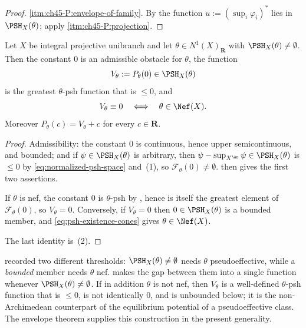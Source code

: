 \begin{proof}
\cref{itm:ch45-P:envelope-of-family}.  By  the
function $u:=(\sup_i\varphi_i)^*$ lies in $\PSH_X(\theta)$; apply
\cref{itm:ch45-P:projection}.
\end{proof}

\begin{corollary}
\label{cor:ch45-extremal}
Let $X$ be integral projective unibranch and let
$\theta\in N^1(X)_{\mathbf R}$ with $\PSH_X(\theta)\ne\emptyset$.  Then
the constant $0$ is an admissible obstacle for $\theta$, the function
\[
 V_\theta:=P_\theta(0)\in\PSH_X(\theta)
\]
is the greatest $\theta$-psh function that is $\le0$, and
\[
 V_\theta\equiv0
 \quad\Longleftrightarrow\quad
 \theta\in\Nef(X).
\]
Moreover $P_\theta(c)=V_\theta+c$ for every $c\in\mathbf R$.
\end{corollary}

\begin{proof}
Admissibility: the constant $0$ is continuous, hence upper semicontinuous,
and bounded; and if $\psi\in\PSH_X(\theta)$ is arbitrary, then
$\psi-\sup_{X^{\An}}\psi\in\PSH_X(\theta)$ is $\le0$ by
\eqref{eq:normalized-psh-space} and
\,(1), so $\mathcal F_\theta(0)\ne\emptyset$.
 then gives the first two assertions.

If $\theta$ is nef, the constant $0$ is $\theta$-psh by
, hence is itself the greatest element of
$\mathcal F_\theta(0)$, so $V_\theta=0$.  Conversely, if $V_\theta=0$ then
$0\in\PSH_X(\theta)$ is a bounded member, and
\eqref{eq:psh-existence-cones} gives $\theta\in\Nef(X)$.

The last identity is \,(2).
\end{proof}

\begin{remark}
\label{rem:ch45-two-thresholds}
 recorded two different thresholds:
$\PSH_X(\theta)\ne\emptyset$ needs $\theta$ pseudoeffective, while a
\emph{bounded} member needs $\theta$ nef.   makes
the gap between them into a single function whenever
$\PSH_X(\theta)\ne\emptyset$.  If in addition $\theta$ is not nef, then
$V_\theta$ is a well-defined $\theta$-psh function that is $\le0$, is
not identically $0$, and is unbounded below;
it is the non-Archimedean counterpart of the equilibrium potential of a
pseudoeffective class.  The envelope theorem supplies this construction in the present
generality.
\end{remark}

